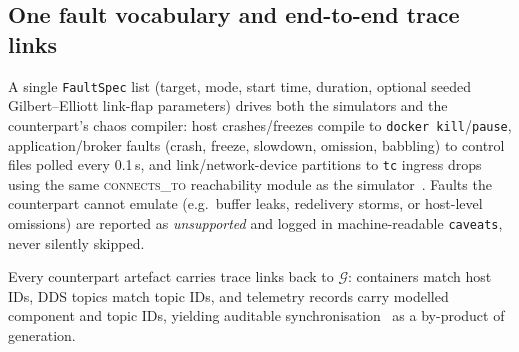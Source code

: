 \subsection{One fault vocabulary and end-to-end trace links}
\label{sec:tracelinks}

A single \texttt{FaultSpec} list (target, mode, start time, duration, optional seeded Gilbert--Elliott link-flap parameters) drives both the simulators and the counterpart's chaos compiler: host crashes/freezes compile to \texttt{docker kill}/\texttt{pause}, application/broker faults (crash, freeze, slowdown, omission, babbling) to control files polled every 0.1\,s, and link/network-device partitions to \texttt{tc} ingress drops using the same \textsc{connects\_to} reachability module as the simulator~\citep{sag-software}. Faults the counterpart cannot emulate (e.g.\ buffer leaks, redelivery storms, or host-level omissions) are reported as \emph{unsupported} and logged in machine-readable \texttt{caveats}, never silently skipped.

Every counterpart artefact carries trace links back to $\mathcal{G}$: containers match host IDs, DDS topics match topic IDs, and telemetry records carry modelled component and topic IDs, yielding auditable synchronisation~\citep{bordeleau2020towards} as a by-product of generation.
